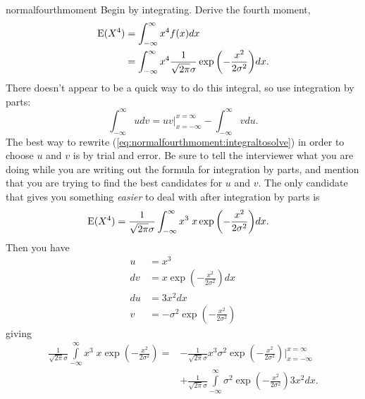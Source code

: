 \begin{answer}{normalfourthmoment}
Begin by integrating.
Derive the fourth moment,
\begin{align}
\operatorname{\mathrm{E}}(X^4)
&= \int_{-\infty}^{\infty}{
          x^4
          f(x)
          dx} \nonumber \\
&= \int_{-\infty}^{\infty}{
          x^4
          \frac{1}{\sqrt{2 \pi} \sigma }
          \exp{\left( -\frac{x^2}{2\sigma^2}  \right)}
          dx}
\label{eq:normalfourthmoment:integraltosolve}
\text{.}
\end{align}
There doesn't appear to be a quick way to do this integral, so use integration by parts:
\[
\int_{-\infty}^{\infty}{ u dv }
=
uv\Big\vert_{x=-\infty}^{x=\infty} - \int_{-\infty}^{\infty}{ v du }
\text{.}
\]
The best way to rewrite
(\ref{eq:normalfourthmoment:integraltosolve}) in order to choose $u$ and $v$ is by trial and error.
Be sure to tell the interviewer what you are doing while you are writing out the formula for integration by parts, and mention that you are trying to find the best candidates for $u$ and $v$.
The only candidate that gives you something \emph{easier} to deal with after integration by parts is
\begin{align*}
\operatorname{\mathrm{E}}(X^4)
&=
          \frac{1}{\sqrt{2 \pi} \sigma }
          \int_{-\infty}^{\infty}{
          x^3
          \;
          x
          \exp{\left( -\frac{x^2}{2\sigma^2}  \right)}
          dx}
\text{.}
\end{align*}
Then you have
\begin{align*}
u   &= x^3      \\
dv  &=
        x
        \exp{\left( -\frac{x^2 }{2\sigma^2} \right)}
        dx
        \\
%
du  &= 3 x^2 dx \\
v   &=
       - \sigma^2
        \exp{\left( -\frac{x^2}{2\sigma^2}  \right)}
\end{align*}
giving
\begin{equation}
\begin{aligned}
\label{eq:fourthmoment:nearlythere}
\frac{1}{\sqrt{2 \pi} \sigma }
\int\limits_{-\infty}^{\infty}{
  x^3
  \;
  x \exp{\left( -\frac{x^2}{2\sigma^2}  \right)}
}
=
&-\frac{1}{\sqrt{2 \pi} \sigma }
x^3
\sigma^2
\exp{\left( -\frac{x^2}{2\sigma^2}  \right)} \bigg|_{x=-\infty}^{x=\infty}
\\
&+
\frac{1}{\sqrt{2 \pi} \sigma }
\int\limits_{-\infty}^{\infty}{
  \sigma^2
  \exp{\left( -\frac{x^2}{2\sigma^2}   \right)}
 3 x^2
  dx
}
\text{.}
\end{aligned}

\end{equation}
\end{answer}
